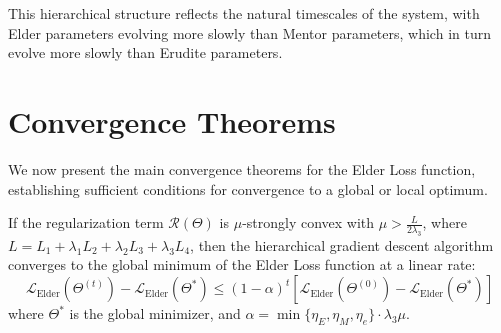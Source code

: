 This hierarchical structure reflects the natural timescales of the system, with Elder parameters evolving more slowly than Mentor parameters, which in turn evolve more slowly than Erudite parameters.

\section{Convergence Theorems}

We now present the main convergence theorems for the Elder Loss function, establishing sufficient conditions for convergence to a global or local optimum.

\begin{theorem}
If the regularization term $\mathcal{R}(\Theta)$ is $\mu$-strongly convex with $\mu > \frac{L}{2\lambda_3}$, where $L = L_1 + \lambda_1 L_2 + \lambda_2 L_3 + \lambda_3 L_4$, then the hierarchical gradient descent algorithm converges to the global minimum of the Elder Loss function at a linear rate:
\begin{equation}
\mathcal{L}_{\text{Elder}}(\Theta^{(t)}) - \mathcal{L}_{\text{Elder}}(\Theta^*) \leq (1 - \alpha)^t [\mathcal{L}_{\text{Elder}}(\Theta^{(0)}) - \mathcal{L}_{\text{Elder}}(\Theta^*)]
\end{equation}
where $\Theta^*$ is the global minimizer, and $\alpha = \min\{\eta_E, \eta_M, \eta_e\} \cdot \lambda_3 \mu$.
\end{theorem}

